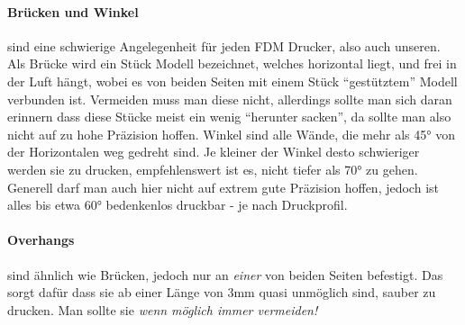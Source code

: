 \paragraph{Brücken und Winkel} sind eine schwierige Angelegenheit für jeden FDM Drucker, also auch unseren.
Als Brücke wird ein Stück Modell bezeichnet, welches horizontal liegt, und frei in der Luft hängt, wobei es von beiden Seiten mit einem Stück "`gestütztem"' Modell verbunden ist. Vermeiden muss man diese nicht, allerdings sollte man sich daran erinnern dass diese Stücke meist ein wenig "`herunter sacken"', da sollte man also nicht auf zu hohe Präzision hoffen.
Winkel sind alle Wände, die mehr als 45° von der Horizontalen weg gedreht sind. Je kleiner der Winkel desto schwieriger werden sie zu drucken, empfehlenswert ist es, nicht tiefer als 70° zu gehen. Generell darf man auch hier nicht auf extrem gute Präzision hoffen, jedoch ist alles bis etwa 60° bedenkenlos druckbar - je nach Druckprofil.

\paragraph{Overhangs} sind ähnlich wie Brücken, jedoch nur an \emph{einer} von beiden Seiten befestigt. Das sorgt dafür dass sie ab einer Länge von 3mm quasi unmöglich sind, sauber zu drucken.
Man sollte sie \emph{wenn möglich immer vermeiden!}